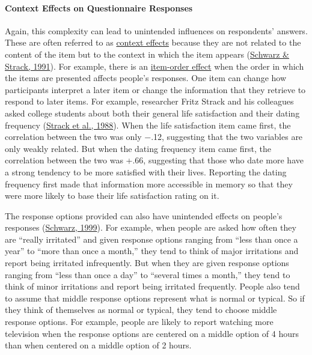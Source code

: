 \documentclass[
]{krantz}
\begin{document}
\hypertarget{context-effects-on-questionnaire-responses}{%
\paragraph*{Context Effects on Questionnaire Responses}\label{context-effects-on-questionnaire-responses}}

Again, this complexity can lead to unintended influences on respondents' answers. These are often referred to as \protect\hyperlink{context-effect}{context effects} because they are not related to the content of the item but to the context in which the item appears (\protect\hyperlink{ref-schwarz1991context}{Schwarz \& Strack, 1991}). For example, there is an \protect\hyperlink{item-order-effect}{item-order effect} when the order in which the items are presented affects people's responses. One item can change how participants interpret a later item or change the information that they retrieve to respond to later items. For example, researcher Fritz Strack and his colleagues asked college students about both their general life satisfaction and their dating frequency (\protect\hyperlink{ref-strack1988priming}{Strack et al., 1988}). When the life satisfaction item came first, the correlation between the two was only −.12, suggesting that the two variables are only weakly related. But when the dating frequency item came first, the correlation between the two was +.66, suggesting that those who date more have a strong tendency to be more satisfied with their lives. Reporting the dating frequency first made that information more accessible in memory so that they were more likely to base their life satisfaction rating on it.

The response options provided can also have unintended effects on people's responses (\protect\hyperlink{ref-schwarz1999self}{Schwarz, 1999}). For example, when people are asked how often they are ``really irritated'' and given response options ranging from ``less than once a year'' to ``more than once a month,'' they tend to think of major irritations and report being irritated infrequently. But when they are given response options ranging from ``less than once a day'' to ``several times a month,'' they tend to think of minor irritations and report being irritated frequently. People also tend to assume that middle response options represent what is normal or typical. So if they think of themselves as normal or typical, they tend to choose middle response options. For example, people are likely to report watching more television when the response options are centered on a middle option of 4 hours than when centered on a middle option of 2 hours.
\end{document}
